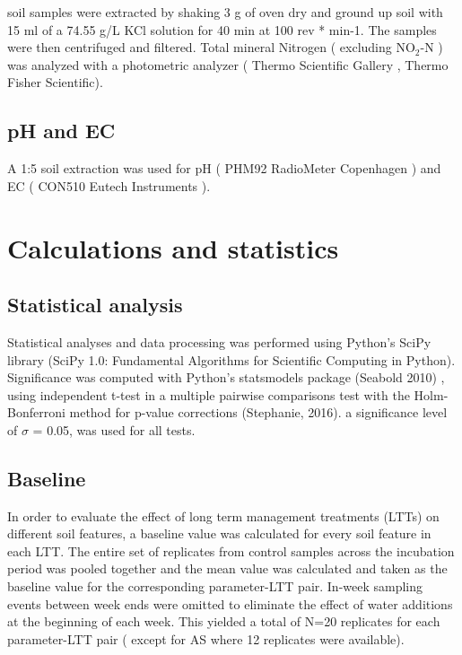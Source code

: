     	soil samples were extracted by shaking 3 g of oven dry and ground up soil with 15 ml of a 74.55 g/L KCl solution for 40 min at 100 rev * min-1. The samples were then centrifuged and filtered. Total mineral Nitrogen ( excluding NO$_2$-N ) was analyzed with a photometric analyzer ( Thermo Scientific Gallery , Thermo Fisher Scientific).

    \subsection{pH and EC}

    	A 1:5 soil extraction was used for pH ( PHM92 RadioMeter Copenhagen ) and EC ( CON510 Eutech Instruments ).


\section{Calculations and statistics}

    \subsection{Statistical analysis}

  	 Statistical analyses and data processing was performed using Python’s SciPy library (SciPy 1.0: Fundamental Algorithms for Scientific Computing in Python). Significance was computed with Python’s statsmodels package (Seabold 2010) , using independent t-test in a multiple pairwise comparisons test with the Holm-Bonferroni method for p-value corrections (Stephanie, 2016). a significance level of $\sigma$  = 0.05, was used for all tests. \\

    \subsection{Baseline}

    	In order to evaluate the effect of long term management treatments (LTTs) on different soil features, a baseline value was calculated for every soil feature in each LTT. The entire set of replicates from control samples across the incubation period was pooled together and the mean value was calculated and taken as the baseline value for the corresponding parameter-LTT pair. In-week sampling events between week ends were omitted to eliminate the effect of water additions at the beginning of each week. This yielded a total of N=20 replicates for each parameter-LTT pair ( except for AS where 12 replicates were available).


